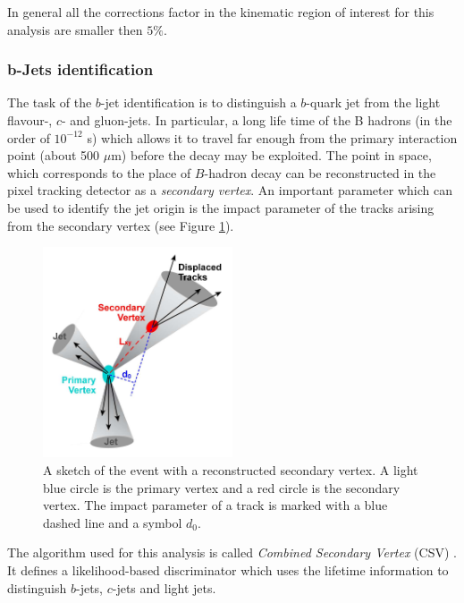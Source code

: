 In general all the corrections factor in the kinematic region of interest for this analysis are smaller then $5\%$.

\subsubsection{b-Jets identification}\label{ssec:bTag}

The task of the $b$-jet identification is to distinguish a $b$-quark jet from the light flavour-, $c$- and gluon-jets. In particular,
a long life time of the B hadrons (in the order of $10^{-12}$ s) which allows it to travel far enough from the primary interaction point (about 500 $\mu$m) before the decay
may be exploited. The point in space, which corresponds to the place of $B$-hadron decay can be reconstructed in the pixel tracking detector as a \textit{secondary vertex}. 
An important parameter which can be used to identify the jet origin is the impact parameter of the tracks arising from the secondary vertex (see Figure \ref{fig:SV}).

\begin{figure}[t]
  \centering
  \includegraphics[width=0.5\textwidth]{04_event_reconstruction/plots/btagging_cartoon.png}
  \caption{A sketch of the event with a reconstructed secondary vertex. A light blue circle is the primary vertex and a red circle is the secondary vertex. The impact 
  parameter of a track is marked with a blue dashed line and a symbol $d_{0}$.}
  \label{fig:SV}
\end{figure}

The algorithm used for this analysis is called \textit{Combined Secondary Vertex} (CSV) \cite{CMS-PAS-BTV-13-001}. It defines a likelihood-based discriminator which uses 
the lifetime information to distinguish $b$-jets, $c$-jets and light jets.

